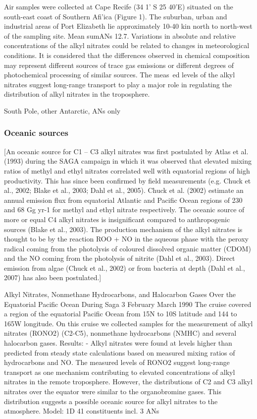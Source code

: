 \documentclass[11pt,a4paper]{article}
\begin{document}
\citep{deKock1994}
Air samples were collected at Cape Recife (34 1' S 25 40'E) situated on the south-east coast of Southern Afi'ica (Figure 1). The suburban, urban and industrial areas of Port Elizabeth lie approximately 10-40 kin north to north-west of the sampling site.
Mean sumANs 12.7.
Variations in absolute and relative concentrations of the alkyl nitrates could be related to changes in meteorological conditions. It is considered that the differences observed in chemical composition may represent different sources of trace gas emissions or different degrees of photochemical processing of similar sources. The meas~ed levels of the alkyl nitrates suggest long-range transport to play a major role in regulating the distribution of alkyl nitrates in the troposphere.

\citep{Beyersdorf2010}
South Pole, other Antarctic, ANs only

\subsubsection*{Oceanic sources}
\citep{Newland2013}
[An oceanic source for C1 – C3 alkyl nitrates was first postulated by Atlas et al. (1993) during the SAGA campaign in which it was observed that elevated mixing ratios of methyl and ethyl nitrates correlated well with equatorial regions of high productivity. This has since been confirmed by field measurements (e.g. Chuck et al., 2002; Blake et al., 2003; Dahl et al., 2005). Chuck et al. (2002) estimate an annual emission flux from equatorial Atlantic and Pacific Ocean regions of 230 and 68 Gg yr-1 for methyl and ethyl nitrate respectively. The oceanic source of more or equal C4 alkyl nitrates is insignificant compared to anthropogenic sources (Blake et al., 2003).
The production mechanism of the alkyl nitrates is thought to be by the reaction ROO + NO in the aqueous phase with the peroxy radical coming from the photolysis of coloured dissolved organic matter (CDOM) and the NO coming from the photolysis of nitrite (Dahl et al., 2003). Direct emission from algae (Chuck et al., 2002) or from bacteria at depth (Dahl et al., 2007) has also been postulated.]

\citep{Atlas1993}
Alkyl Nitrates, Nonmethane Hydrocarbons, and Halocarbon Gases Over the Equatorial Pacific Ocean During Saga 3
February March 1990
The cruise covered a region of the equatorial Pacific Ocean from 15N to 10S latitude and 144 to 165W longitude. On this cruise we collected samples for the measurement of alkyl nitrates (RONO2) (C2-C5), nonmethane hydrocarbons (NMHC) and several halocarbon gases.
Results:
- Alkyl nitrates were found at levels higher than predicted from steady state calculations based on measured mixing ratios of hydrocarbons and NO. The measured levels of RONO2 suggest long-range transport as one mechanism contributing to elevated concentrations of alkyl nitrates in the remote troposphere. However, the distributions of C2 and C3 alkyl nitrates over the equator were  similar to the organobromine gases. This distribution suggests
a possible oceanic source for alkyl nitrates to the atmosphere.
Model: 1D 41 constituents incl. 3 ANs
\end{document}
